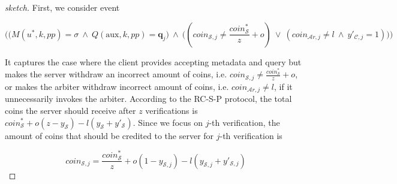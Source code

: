 \begin{proof}[sketch]
  First, we consider event 
  
   $$\Bigg(\Big(M(u^{\scriptscriptstyle *},k,{pp})= \sigma \  \wedge \ Q(\text{aux},k, {pp})= \bm{q}_{\scriptscriptstyle j}\Big)\ \wedge \
  \Big((coin_{\scriptscriptstyle\mathcal{S},j}\neq  \frac{coin_{\scriptscriptstyle\mathcal S}^{\scriptscriptstyle*}}{z}+o)\ \vee \ (coin_{\scriptscriptstyle\mathcal{A}r,j}\neq l\ \wedge\  y'_{\scriptscriptstyle \mathcal {C},j}=1)\Big)\Bigg)$$
  
  
  It captures the case where the client provides  accepting metadata and query  but makes the server withdraw an incorrect amount of coins, i.e. $coin_{\scriptscriptstyle\mathcal{S},j}\neq  \frac{coin_{\scriptscriptstyle\mathcal S}^{\scriptscriptstyle*}}{z}+o$, or makes the arbiter withdraw incorrect amount of coins, i.e. $coin_{\scriptscriptstyle\mathcal{A}r,j}\neq l$, if it unnecessarily invokes the arbiter. According to the RC-S-P protocol, the total coins the server should receive after $z$ verifications is $coin^{\scriptscriptstyle *}_{\scriptscriptstyle\mathcal S}+o(z-y_{\scriptscriptstyle\mathcal S})-l(y_{\scriptscriptstyle\mathcal S}+y'_{\scriptscriptstyle\mathcal S})$. Since we focus on  $j$-th verification, the amount of  coins that should be credited to the server for $j$-th verification is
  
  \begin{equation}\label{equ::what-server-recives-in-j}
   coin_{\scriptscriptstyle\mathcal{S},j}=\frac{coin^{\scriptscriptstyle *}_{\scriptscriptstyle\mathcal S}}{z}+o(1-y_{\scriptscriptstyle\mathcal {S},j})-l(y_{\scriptscriptstyle\mathcal {S},j}+y'_{\scriptscriptstyle\mathcal {S},j})
     \end{equation}
  
  
  

\end{proof}
